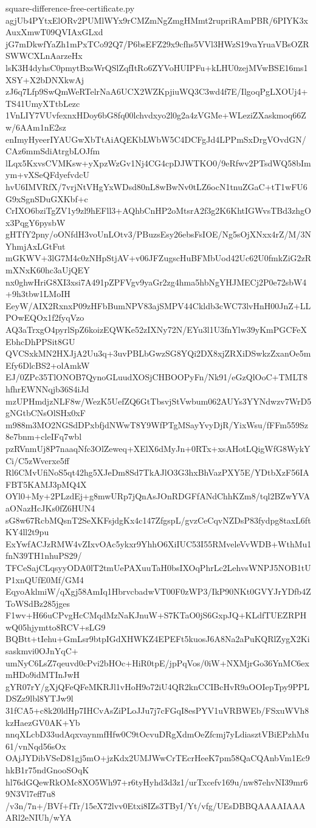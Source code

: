 \documentclass[11pt]{article}
\theoremstyle{definition}
\theoremstyle{remark}
\begin{document}
\begin{filecontents*}[overwrite]{square-difference-free-certificate.py}
agjUb4PYtxElORv2PUMlWYx9rCMZmNgZmgHMmt2rupriRAmPBR/6PIYK3xAuxXmwT09QVIAxGLxd
jG7mDkwfYaZh1mPxTCo92Q7/P6bsEFZ29x9cfhs5VVl3HWzS19vaYruaVBsOZRSWWCXLnAarzeHx
lsK3H4dyhsC0pmytBxsWrQSlZqfItRo6ZYVoHUIPFu+kLHU0zejMVwBSE16ms1XSY+X2bDNXkwAj
zJ6q7Lfp9SwQmWeRTelrNaA6UCX2WZKpjiuWQ3C3wd4f7E/IlgoqPgLXOUj4+TS41UmyXTtbLezc
1VnLIY7VUvfexnxHDoy6bG8fq00lchvdxyo2l0g2a4zVGMe+WLeziZXaskmoq66Zw/6AAm1nE2sz
enImyHyeerIYAUGwXbTtAiAQEKbLWbW5C4DCFgJd4LPPmSxDrgVOvdGN/CAz6mmSdiAtrgbLOJfm
lLqx5KxvsCVMKsw+yXpzWzGv1Nj4CG4cpDJWTKO0/9eRfwv2PTsdWQ58bImym+vXSeQFdyefvdcU
hvU6IMVRfX/7vrjNtVHgYxWDsd80nL8wBwNv0tLZ6ocN1tnuZGaC+tT1wFU6G9xSgnSDuGXKbf+c
CrIXO6bziTgZV1y9zl9hEFll3+AQhbCnHP2oMtsrA2f3g2K6KhtIGWvsTBd3zhgOx3PqgY6pysbW
gHTfY2pny/oONfdH3voUnLOtv3/PBuzsEsy26ebsFsIOE/Ng5sOjXNxx4rZ/M/3NYhmjAxLGtFut
mGKWV+3lG7M4c0zNHpStjAV+v06JFZugscHuBFMbUod42Uc62U0fmkZiG2zRmXNxK60hc3aUjQEY
nx0ghwHriG8XI3xsi7A491pZPFVgv9yaGr2zg4hma5hbNgYHJMECj2P0e72sbW4+9h3tbw1LMoIH
EeyW/AIX2RxnxP09zHFbBumNPV83ajSMPV44Ckldb3cWC73lvHnH00JnZ+LLPOwEQOx1f2fyqVzo
AQ3aTrxgO4pyrlSpZ6koizEQWKe52zIXNy72N/EYu3l1U3fnYlw39yKmPGCFeXEbhcDhPPSit8GU
QVCSxkMN2HXJjA2Uu3q+3uvPBLbGwzSG8YQi2DX8xjZRXiDSwkzZxanOe5mEfy6DlcBS2+olAmkW
EJ/0ZPc35TlONOB7QynoGLuudXOSjCHBOOPyFn/Nk91/eGzQlOoC+TMLT8hfhrEWNNqjb36S4iJd
mzUPHmdjzNLF8w/WezK5UefZQ6GtTbsvjStVwbum062AUYs3YYNdwzv7WrD5gNGtbCNsOlSHx0xF
m988m3MO2NGSdDPxbfjdNWwT8Y9WfPTgMSayYvyDjR/YixWsu/fFFm559Sz8e7bnm+cleIFq7wbl
pzRVnmUj8P7naaqNfc3OlZeweq+XElX6dMyJn+0RTx+xsAHotLQigWfG8WykYCi/C5zWverxe5ff
Rl6CMvUfiNoS5qt42hg5XJeDm8Sd7TkAJlO3G3hxBhVazPXY5E/YDtbXzF56IAFBT5KAMJ3pMQ4X
OYl0+My+2PLzdEj+g8mwURp7jQnAsJOnRDGFfANdChhKZm8/tql2BZwYVAaONazHcJKs0fZ6HUN4
sG8w67RcbMQsnT2SeXKFsjdgKx4c147ZfgspL/gvzCeCqvNZDsP83fydpg8taxL6ftKY4ll2t9pu
ExYwfACJzRMW4vZIxvOAc5ykxr9YhhO6XiIUC53I55RMveleVvWDB+WthMu1fnN39TH1nhuPS29/
TFCeSajCLqsyyODA0lT2tmUePAXuuTaH0bsIXOqPhrLc2LehvsWNPJ5NOB1tUP1xnQUfE0Mf/GM4
EqyoAklmiW/qXgj58AmIq1HbrvcbadwVT00F0zWP3/IkP90NKt0GVYJrYDfb4ZToWSdBz285jges
F1wv+H66uCPvgHcCMqdMzNaKJnuW+S7KTaO0jS6GxpJQ+KLdfTUEZRPHwQ05hjymtto8RCV+sLG9
BQBtt+tIehu+GmLsr9btpIGdXHWKZ4EPEFt5kuosJ6A8Na2aPuKQRlZygX2Kisaskmvi0OJnYqC+
umNyC6LsZ7qeuvd0cPvi2bHOc+HiR0tpE/jpPqVos/0iW+NXMjrGo36YnMC6exmHDo9idMTInJwH
gYR07rY/gXjQFeQFeMKRJl1vHoH9o72iU4QR2knCCIBcHvR9aOOIepTpy9PPLDSZz9lbl8YTJw9l
31fCA5+c8k20ldHp7IHCvAsZiPLoJJu7j7cFGqI8esPYV1uVRBWEb/FSxuWVh8kzHaezGV0AK+Yb
nnqXLcbD33udAqxvaynmfHfw0C9tOcvuDRgXdmOeZfcmj7yLdiasztVBiEPzhMu61/vnNqd56sOx
OAjJYDibVSeD81gj5mO+jzKdx2UMJWwCrTEcrHeeK7pm58QaCQAnbVm1Ec9hkB1r75ndGnooSOqK
hl76dGQewRkOMc8XO5Wh97+r6tyHyhd3d3z1/urTxcefv169u/nw87ehvNI39mr69N3Vl7eff7u8
/v3n/7n+/BVf+fTr/15eX72lvv0Etxi8IZs3TByI/Yt/vfg/UEsDBBQAAAAIAAAARl2eNIUh/wYA

\end{filecontents*}
\end{document}
